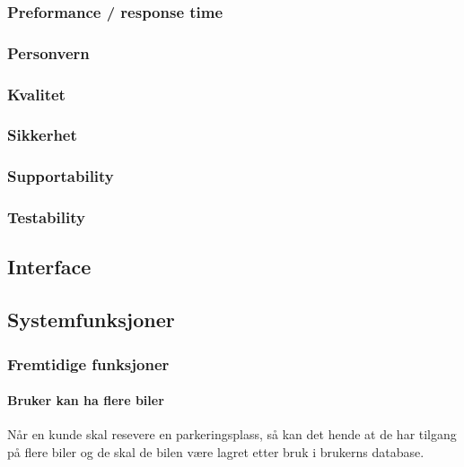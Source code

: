 \documentclass[12pt]{article}
\begin{document}
        \subsubsection{Preformance / response time}


        \subsubsection{Personvern}


        \subsubsection{Kvalitet}


        \subsubsection{Sikkerhet}


        \subsubsection{Supportability}


        \subsubsection{Testability}
        

    \subsection{Interface}

    \subsection{Systemfunksjoner}

        \subsubsection{Fremtidige funksjoner}

            \paragraph{Bruker kan ha flere biler}
            Når en kunde skal resevere en parkeringsplass, så kan det hende at de har tilgang på flere biler og de skal de bilen være lagret etter bruk i brukerns database.
\end{document}
